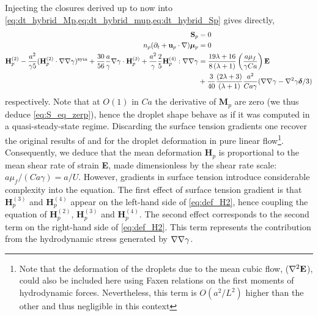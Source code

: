 Injecting the closures derived up to now into \ref{eq:dt_hybrid_Mp,eq:dt_hybrid_mup,eq:dt_hybrid_Sp} gives directly,
\begin{align}    
\textbf{S}_p &= 0 \label{eq:S_eq_zerp}\\
    n_p (\pddt + \textbf{u}_p \cdot \grad)\bm\mu_p &= 0\\
    \textbf{H}_p^{(2)}
    - \frac{a^2}{\gamma 5}(\textbf{H}_p^{(2)}\cdot\grad\grad \gamma)^\text{sym} 
    +
    \frac{30}{56}\frac{a}{\gamma}\grad\gamma\cdot \textbf{H}^{(3)}_p
    +\frac{a^2}{\gamma} \frac{2}{5}\textbf{H}_p^{(4)}:\grad\grad \gamma
    \nonumber
    &=
    \frac{19 \lambda + 16}{8 \left(\lambda + 1\right)}
    \left(\frac{a \mu_f}{\gamma Ca}\right)
    \textbf{E}\\
    &+ 
    \frac{3}{40}\frac{(2\lambda +3)}{(\lambda+1)} 
    \frac{a^2}{Ca\gamma} 
    (\grad\grad\gamma-\grad^2\gamma\bm\delta/3)
    \label{eq:def_H2}
\end{align}
respectively. 
Note that at $O(1)$ in $Ca$ the derivative of $\textbf{M}_p$ are zero (we thus deduce \ref{eq:S_eq_zerp}), hence the droplet shape behave as if it was computed in a quasi-steady-state regime.
Discarding the surface tension gradients one recover the original results of \citet{taylor1932viscosity,rallison1984deformation} and \citet{nadim1996concise} for the droplet deformation in pure linear flow\footnote{Note that the deformation of the droplets due to the mean cubic flow, ($\mathbf{\nabla}^2\textbf{E}$), could also be included here using Faxen relations on the first moments of hydrodynamic forces.
Nevertheless, this term is $O(a^2/L^2)$ higher than the other and thus negligible in this context }.  
Consequently, we deduce that the mean deformation $\textbf{H}_p$ is proportional to the mean shear rate of strain \textbf{E}, made dimensionless by the shear rate scale: $a \mu_f /(Ca \gamma)= a/U$.
However, gradients in surface tension introduce considerable complexity into the equation.
The first effect of surface tension gradient is that $\textbf{H}_p^{(3)}$ and $\textbf{H}^{(4)}_p$ appear on the left-hand side of \ref{eq:def_H2}, hence coupling the equation of $\textbf{H}_p^{(2)}$, $\textbf{H}_p^{(3)}$ and $\textbf{H}_p^{(4)}$. 
The second effect corresponds to the second term on the right-hand side of \ref{eq:def_H2}. 
This term represents the contribution from the hydrodynamic stress generated by $\mathbf{\nabla}\mathbf{\nabla}\gamma$. 


